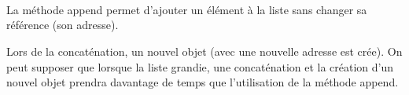 \documentclass[10pt]{article}
\newif\ifprof
\begin{document}
\subparagraph{}
\textit{}%
\ifprof
\begin{corrige}
La ligne 5 permet d'ignorer les lignes (de commentaires) contenant le caractère \#.
La ligne 6 permet de diviser une ligne en 3 chaînes de caractères. La ligne est séparée par les points virgules.

\textsf{jours} est une liste d'entiers. \textsf{Tmin} et \textsf{Tmax} sont des listes de flottants. 

\end{corrige}
\else
\begin{center}
\begin{tabular}{|p{.95\linewidth}|}
\hline
\vspace{1cm}
\dotfill

\vspace{1cm}
\dotfill

\vspace{1cm}
\dotfill

\vspace{1cm}
\dotfill

\vspace{1cm}
 \\
\hline
\end{tabular}
\end{center}

\newpage
\fi

\subparagraph{}
\textit{}%
\ifprof
\begin{corrige}
La méthode \textsf{append} permet d'ajouter un élément à la liste sans changer sa référence (son adresse). 

Lors de la concaténation, un nouvel objet (avec une nouvelle adresse est crée). On peut supposer que lorsque la liste grandie, une concaténation et la création d'un nouvel objet prendra davantage de temps que l'utilisation de la méthode \textsf{append}.
\end{corrige}
\else

\begin{center}
\begin{tabular}{|p{.95\linewidth}|}
\hline
\vspace{1cm}
\dotfill

\vspace{1cm}
\dotfill

\vspace{1cm}
\dotfill

\vspace{1cm}
\dotfill

\vspace{1cm}
 \\
\hline
\end{tabular}
\end{center}
\end{document}
